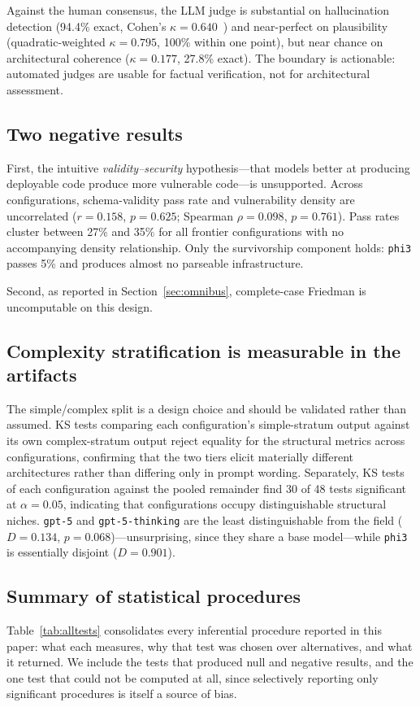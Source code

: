 \documentclass[conference]{IEEEtran}
\begin{document}
Against the human consensus, the LLM judge is substantial on hallucination
detection (94.4\% exact, Cohen's $\kappa=0.640$~\cite{cohen1960coefficient}) and
near-perfect on plausibility (quadratic-weighted $\kappa=0.795$, 100\% within one
point), but near chance on architectural coherence ($\kappa=0.177$, 27.8\%
exact). The boundary is actionable: automated judges are usable for factual
verification, not for architectural assessment.

\subsection{Two negative results}
\label{sec:negative}
First, the intuitive \emph{validity--security} hypothesis---that models better
at producing deployable code produce more vulnerable code---is unsupported.
Across configurations, schema-validity pass rate and vulnerability density are
uncorrelated ($r=0.158$, $p=0.625$; Spearman $\rho=0.098$, $p=0.761$). Pass rates
cluster between 27\% and 35\% for all frontier configurations with no
accompanying density relationship. Only the survivorship component holds:
\texttt{phi3} passes 5\% and produces almost no parseable infrastructure.

Second, as reported in Section~\ref{sec:omnibus}, complete-case Friedman is
uncomputable on this design.

\subsection{Complexity stratification is measurable in the artifacts}
\label{sec:stratacheck}
The simple/complex split is a design choice and should be validated rather than
assumed. KS tests comparing each configuration's simple-stratum output against
its own complex-stratum output reject equality for the structural metrics across
configurations, confirming that the two tiers elicit materially different
architectures rather than differing only in prompt wording. Separately, KS tests
of each configuration against the pooled remainder find 30 of 48 tests
significant at $\alpha=0.05$, indicating that configurations occupy
distinguishable structural niches. \texttt{gpt-5} and \texttt{gpt-5-thinking} are
the least distinguishable from the field ($D=0.134$, $p=0.068$)---unsurprising,
since they share a base model---while \texttt{phi3} is essentially disjoint
($D=0.901$).

\subsection{Summary of statistical procedures}
\label{sec:testsummary}
Table~\ref{tab:alltests} consolidates every inferential procedure reported in
this paper: what each measures, why that test was chosen over alternatives, and
what it returned. We include the tests that produced null and negative results,
and the one test that could not be computed at all, since selectively reporting
only significant procedures is itself a source of bias.
\end{document}
